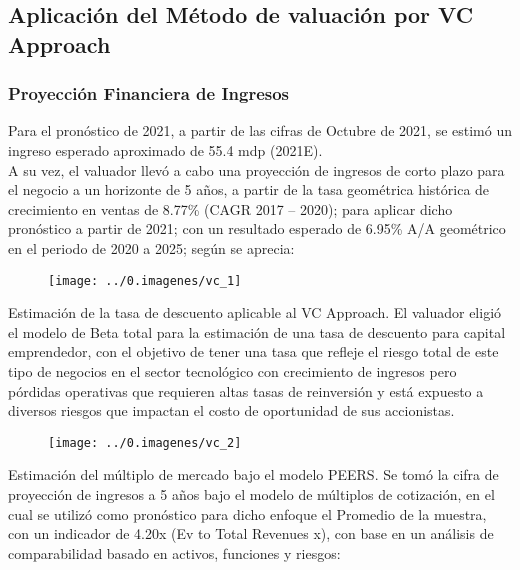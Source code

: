
\subsection{Aplicaci\'on del M\'etodo de valuaci\'on por VC Approach}

\subsubsection{Proyecci\'on Financiera de Ingresos}

Para el pron\'ostico de 2021, a partir de las cifras de Octubre de 2021, se estim\'o un ingreso esperado aproximado de 55.4 mdp (2021E). \\


A su vez, el valuador llev\'o a cabo una proyecci\'on de ingresos de corto plazo para el negocio a un horizonte de 5 a\~nos, a partir de la tasa geom\'etrica hist\'orica de crecimiento en ventas de 8.77\% (CAGR 2017 – 2020); para aplicar dicho pron\'ostico a partir de 2021; con un resultado esperado de 6.95\% A/A geom\'etrico en el periodo de 2020 a 2025; seg\'un se aprecia:\\

\begin{figure}[H]
\centering
\texttt{[image: ../0.imagenes/vc\_1]}
\end{figure}


\textcolor{principal}{Estimaci\'on de la tasa de descuento aplicable al VC Approach.} El valuador eligi\'o el modelo de Beta total para la estimaci\'on de una tasa de descuento para capital emprendedor, con el objetivo de tener una tasa que refleje el riesgo total de este tipo de negocios en el sector tecnol\'ogico con crecimiento de ingresos pero p\'ordidas operativas que requieren altas tasas de reinversi\'on y est\'a expuesto a diversos riesgos que impactan el costo de oportunidad de sus accionistas.\\

\begin{figure}[H]
\centering
\texttt{[image: ../0.imagenes/vc\_2]}
\end{figure}

\textcolor{principal}{Estimaci\'on del m\'ultiplo de mercado bajo el modelo PEERS.} Se tom\'o la cifra de proyecci\'on de ingresos a 5 a\~nos bajo el modelo de m\'ultiplos de cotizaci\'on, en el cual se utiliz\'o como pron\'ostico para dicho enfoque el Promedio de la muestra, con un indicador de 4.20x (Ev to Total Revenues x), con base en un an\'alisis de comparabilidad basado en activos, funciones y riesgos:\\

